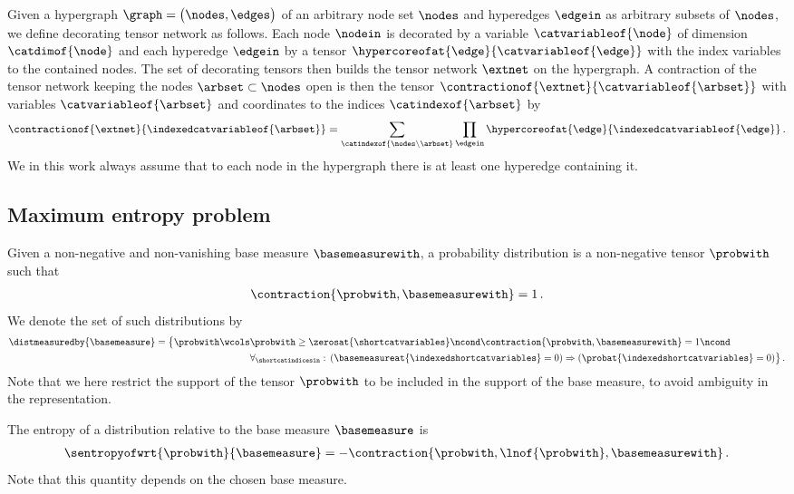 Given a hypergraph $\graph=\big(\nodes,\edges\big)$ of an arbitrary node set $\nodes$ and hyperedges $\edgein$ as arbitrary subsets of $\nodes$, we define decorating tensor network as follows.
Each node $\nodein$ is decorated by a variable $\catvariableof{\node}$ of dimension $\catdimof{\node}$ and each hyperedge $\edgein$ by a tensor $\hypercoreofat{\edge}{\catvariableof{\edge}}$ with the index variables to the contained nodes.
The set of decorating tensors then builds the tensor network $\extnet$ on the hypergraph.
A contraction of the tensor network keeping the nodes $\arbset\subset\nodes$ open is then the tensor $\contractionof{\extnet}{\catvariableof{\arbset}}$ with variables $\catvariableof{\arbset}$ and coordinates to the indices $\catindexof{\arbset}$ by
\begin{align*}
    \contractionof{\extnet}{\indexedcatvariableof{\arbset}}
    = \sum_{\catindexof{\nodes\backslash\arbset}} \prod_{\edgein} \hypercoreofat{\edge}{\indexedcatvariableof{\edge}} \, .
\end{align*}
We in this work always assume that to each node in the hypergraph there is at least one hyperedge containing it.

\subsection{Maximum entropy problem}

Given a non-negative and non-vanishing base measure $\basemeasurewith$, a probability distribution is a non-negative tensor $\probwith$ such that
\begin{align*}
    \contraction{\probwith,\basemeasurewith} = 1 \, .
\end{align*}
We denote the set of such distributions by
\begin{align*}
    \distmeasuredby{\basemeasure}
    = \big\{ \probwith \wcols &\probwith \geq \zerosat{\shortcatvariables} \ncond \contraction{\probwith,\basemeasurewith} = 1 \ncond \\
    &\forall_{\shortcatindicesin}: \, (\basemeasureat{\indexedshortcatvariables}=0) \Rightarrow (\probat{\indexedshortcatvariables}=0)  \big\} \, .
\end{align*}
Note that we here restrict the support of the tensor $\probwith$ to be included in the support of the base measure, to avoid ambiguity in the representation.

The entropy of a distribution relative to the base measure $\basemeasure$ is
\begin{align*}
    \sentropyofwrt{\probwith}{\basemeasure}
    = -\contraction{\probwith,\lnof{\probwith},\basemeasurewith} \, .
\end{align*}
Note that this quantity depends on the chosen base measure.


